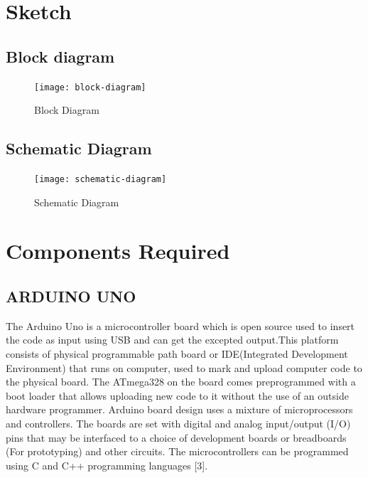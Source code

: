 \documentclass[conference]{IEEEtran}
\begin{document}
    \section{Sketch}

    \subsection{Block diagram}
    \begin{figure}[htbp]
        \centerline{\texttt{[image: block-diagram]}}
        \caption{Block Diagram}
        \label{fig}
    \end{figure}

    \subsection{Schematic Diagram}
    \begin{figure}[htbp]
        \centerline{\texttt{[image: schematic-diagram]}}
        \caption{Schematic Diagram}
        \label{fig}
    \end{figure}
    \section{Components Required}


    \subsection{ARDUINO UNO}\label{AA}
    The Arduino Uno is a microcontroller board which is open
    source used to insert the code as input using USB and can get
    the excepted output.This platform consists of physical
    programmable path board or IDE(Integrated Development
    Environment) that runs on computer, used to mark and
    upload computer code to the physical board. The
    ATmega328 on the board comes preprogrammed with a
    boot loader that allows uploading new code to it without the
    use of an outside hardware programmer. Arduino board
    design uses a mixture of microprocessors and controllers.
    The
    boards
    are
    set
    with
    digital
    and
    analog input/output (I/O) pins that may be interfaced to a
    choice of development boards or breadboards (For
    prototyping) and other circuits. The microcontrollers can be
    programmed using C and C++ programming languages [3].
\end{document}
